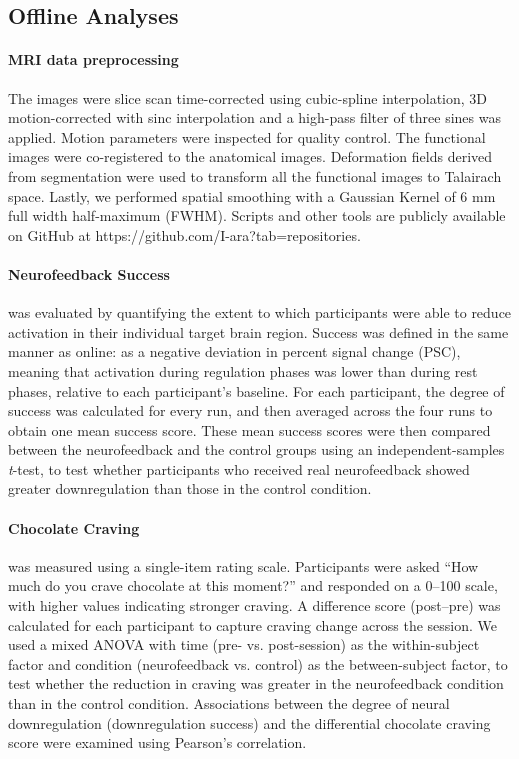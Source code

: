 \documentclass[]{imag-ms-template}
\begin{document}
\subsection{Offline Analyses}

\paragraph{MRI data preprocessing} The images were slice scan time-corrected using cubic-spline interpolation, 3D motion-corrected with sinc interpolation and a high-pass filter of three sines was applied. Motion parameters were inspected for quality control. The functional images were co-registered to the anatomical images. Deformation fields derived from segmentation were used to transform all the functional images to Talairach space. Lastly, we performed spatial smoothing with a Gaussian Kernel of 6 mm full width half-maximum (FWHM). Scripts and other tools are publicly available on GitHub at https://github.com/I-ara?tab=repositories.

\paragraph{Neurofeedback Success} was evaluated by quantifying the extent to which participants were able to reduce activation in their individual target brain region. Success was defined in the same manner as online: as a negative deviation in percent signal change (PSC), meaning that activation during regulation phases was lower than during rest phases, relative to each participant’s baseline. For each participant, the degree of success was calculated for every run, and then averaged across the four runs to obtain one mean success score. These mean success scores were then compared between the neurofeedback and the control groups using an independent-samples\textit{ t}-test,  to test whether participants who received real neurofeedback showed greater downregulation than those in the control condition. 

\paragraph{Chocolate Craving} was measured using a single-item rating scale. Participants were asked “How much do you crave chocolate at this moment?” and responded on a 0–100 scale, with higher values indicating stronger craving. A difference score (post–pre) was calculated for each participant to capture craving change across the session. We used a mixed ANOVA with time (pre- vs. post-session) as the within-subject factor and condition (neurofeedback vs. control) as the between-subject factor,  to test whether the reduction in craving was greater in the neurofeedback condition than in the  control condition. Associations between the degree of neural downregulation (downregulation success) and the differential chocolate craving score were examined using Pearson’s correlation.
\end{document}
